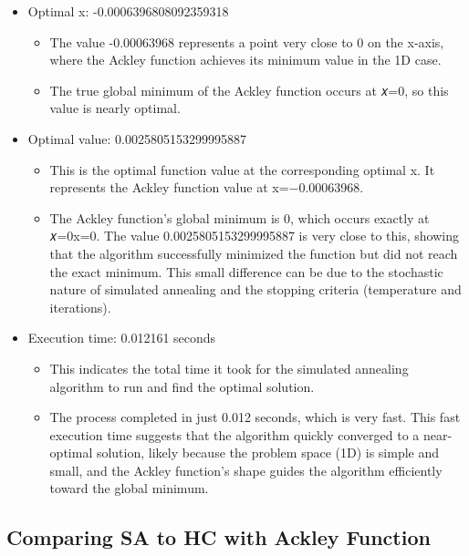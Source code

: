 \documentclass[
  letterpaper,
  DIV=11,
  numbers=noendperiod]{scrreprt}
\providecommand{\tightlist}{%
  \setlength{\itemsep}{0pt}\setlength{\parskip}{0pt}}\usepackage{longtable,booktabs,array}
\begin{document}
\begin{itemize}
\tightlist
\item
  Optimal x: -0.0006396808092359318

  \begin{itemize}
  \tightlist
  \item
    The value -0.00063968 represents a point very close to 0 on the
    x-axis, where the Ackley function achieves its minimum value in the
    1D case.
  \item
    The true global minimum of the Ackley function occurs at 𝑥=0, so
    this value is nearly optimal.
  \end{itemize}
\item
  Optimal value: 0.0025805153299995887

  \begin{itemize}
  \tightlist
  \item
    This is the optimal function value at the corresponding optimal x.
    It represents the Ackley function value at x=−0.00063968.
  \item
    The Ackley function's global minimum is 0, which occurs exactly at
    𝑥=0x=0. The value 0.0025805153299995887 is very close to this,
    showing that the algorithm successfully minimized the function but
    did not reach the exact minimum. This small difference can be due to
    the stochastic nature of simulated annealing and the stopping
    criteria (temperature and iterations).
  \end{itemize}
\item
  Execution time: 0.012161 seconds

  \begin{itemize}
  \tightlist
  \item
    This indicates the total time it took for the simulated annealing
    algorithm to run and find the optimal solution.
  \item
    The process completed in just 0.012 seconds, which is very fast.
    This fast execution time suggests that the algorithm quickly
    converged to a near-optimal solution, likely because the problem
    space (1D) is simple and small, and the Ackley function's shape
    guides the algorithm efficiently toward the global minimum.
  \end{itemize}
\end{itemize}

\subsection{Comparing SA to HC with Ackley
Function}\label{comparing-sa-to-hc-with-ackley-function}
\end{document}
